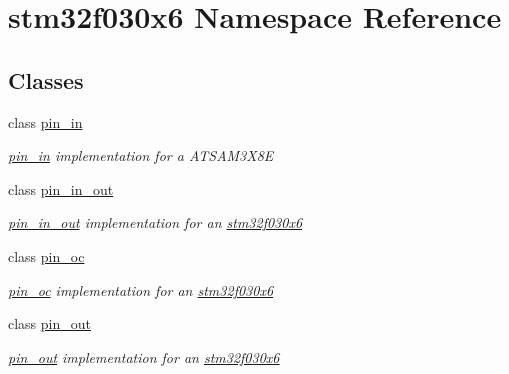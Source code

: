 \hypertarget{namespacestm32f030x6}{}\section{stm32f030x6 Namespace Reference}
\label{namespacestm32f030x6}
\subsection*{Classes}
\begin{DoxyCompactItemize}
\item 
class \hyperlink{classstm32f030x6_1_1pin__in}{pin\+\_\+in}
\begin{DoxyCompactList}\small\item\em \hyperlink{classstm32f030x6_1_1pin__in}{pin\+\_\+in} implementation for a A\+T\+S\+A\+M3\+X8E \end{DoxyCompactList}\item 
class \hyperlink{classstm32f030x6_1_1pin__in__out}{pin\+\_\+in\+\_\+out}
\begin{DoxyCompactList}\small\item\em \hyperlink{classstm32f030x6_1_1pin__in__out}{pin\+\_\+in\+\_\+out} implementation for an \hyperlink{namespacestm32f030x6}{stm32f030x6} \end{DoxyCompactList}\item 
class \hyperlink{classstm32f030x6_1_1pin__oc}{pin\+\_\+oc}
\begin{DoxyCompactList}\small\item\em \hyperlink{classstm32f030x6_1_1pin__oc}{pin\+\_\+oc} implementation for an \hyperlink{namespacestm32f030x6}{stm32f030x6} \end{DoxyCompactList}\item 
class \hyperlink{classstm32f030x6_1_1pin__out}{pin\+\_\+out}
\begin{DoxyCompactList}\small\item\em \hyperlink{classstm32f030x6_1_1pin__out}{pin\+\_\+out} implementation for an \hyperlink{namespacestm32f030x6}{stm32f030x6} \end{DoxyCompactList}\end{DoxyCompactItemize}
